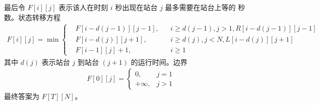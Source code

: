 \documentclass{ctexartutf8}
\numberwithin{theorem}{section}
\numberwithin{theorem}{subsection}
\begin{document}
			最后令 $F[i][j]$ 表示该人在时刻 $i$ 秒出现在站台 $j$ 最多需要在站台上等的
			秒数。状态转移方程
			\begin{align}
			F[i][j] = \min \left\{ \begin{aligned}
				& F[i-d(j-1)][j-1], && i\ge d(j-1), j>1, R[i-d(j-1)][j-1]\\
				& F[i-d(j)][j+1], && i\ge d(j), j<N, L[i-d(j)][j+1]\\
				& F[i-1][j]+1, && i \ge 1
				\end{aligned}
			\right.
			\end{align}
			其中 $d(j)$ 表示站台 $j$ 到站台 $(j+1)$ 的运行时间。边界
			\begin{align}
				F[0][j] = \begin{cases}
					0, & j=1\\
					+\infty, & j>1
				\end{cases}
			\end{align}
			最终答案为 $F[T][N]$。
	\fi
\end{document}
